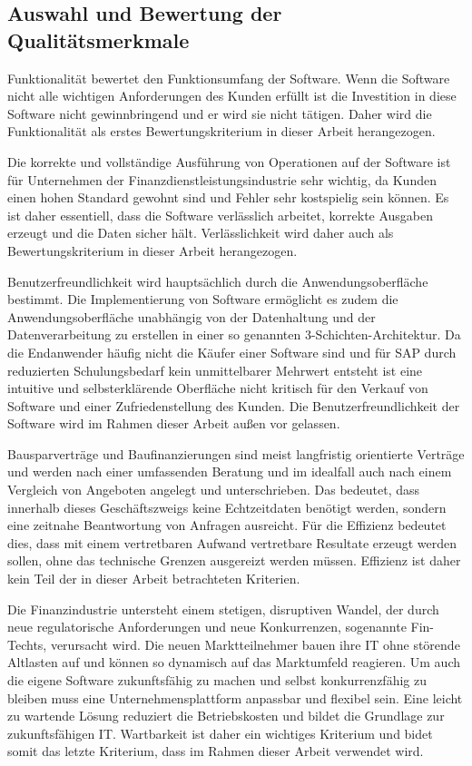         \subsection{Auswahl und Bewertung der Qualitätsmerkmale}

            Funktionalität bewertet den Funktionsumfang der Software. Wenn die Software nicht alle wichtigen Anforderungen des Kunden erfüllt ist die Investition in diese Software nicht gewinnbringend und er wird sie nicht tätigen. Daher wird die Funktionalität als erstes Bewertungskriterium in dieser Arbeit herangezogen.

            Die korrekte und vollständige Ausführung von Operationen auf der Software ist für Unternehmen der Finanzdienstleistungsindustrie sehr wichtig, da Kunden einen hohen Standard gewohnt sind und Fehler sehr kostspielig sein können. Es ist daher essentiell, dass die Software verlässlich arbeitet, korrekte Ausgaben erzeugt und die Daten sicher hält. Verlässlichkeit wird daher auch als Bewertungskriterium in dieser Arbeit herangezogen.

            Benutzerfreundlichkeit wird hauptsächlich durch die Anwendungsoberfläche bestimmt. Die Implementierung von Software ermöglicht es zudem die Anwendungsoberfläche unabhängig von der Datenhaltung und der Datenverarbeitung zu erstellen in einer so genannten 3-Schichten-Architektur. Da die Endanwender häufig nicht die Käufer einer Software sind und für SAP durch reduzierten Schulungsbedarf kein unmittelbarer Mehrwert entsteht ist eine intuitive und selbsterklärende Oberfläche nicht kritisch für den Verkauf von Software und einer Zufriedenstellung des Kunden. Die Benutzerfreundlichkeit der Software wird im Rahmen dieser Arbeit außen vor gelassen.

            Bausparverträge und Baufinanzierungen sind meist langfristig orientierte Verträge und werden nach einer umfassenden Beratung und im idealfall auch nach einem Vergleich von Angeboten angelegt und unterschrieben. Das bedeutet, dass innerhalb dieses Geschäftszweigs keine Echtzeitdaten benötigt werden, sondern eine zeitnahe Beantwortung von Anfragen ausreicht. Für die Effizienz bedeutet dies, dass mit einem vertretbaren Aufwand vertretbare Resultate erzeugt werden sollen, ohne das technische Grenzen ausgereizt werden müssen. Effizienz ist daher kein Teil der in dieser Arbeit betrachteten Kriterien.

            Die Finanzindustrie untersteht einem stetigen, disruptiven Wandel, der durch neue regulatorische Anforderungen und neue Konkurrenzen, sogenannte Fin-Techts, verursacht wird. Die neuen Marktteilnehmer bauen ihre IT ohne störende Altlasten auf und können so dynamisch auf das Marktumfeld reagieren. Um auch die eigene Software zukunftsfähig zu machen und selbst konkurrenzfähig zu bleiben muss eine Unternehmensplattform anpassbar und flexibel sein. Eine leicht zu wartende Lösung reduziert die Betriebskosten und bildet die Grundlage zur zukunftsfähigen IT. Wartbarkeit ist daher ein wichtiges Kriterium und bidet somit das letzte Kriterium, dass im Rahmen dieser Arbeit verwendet wird.

